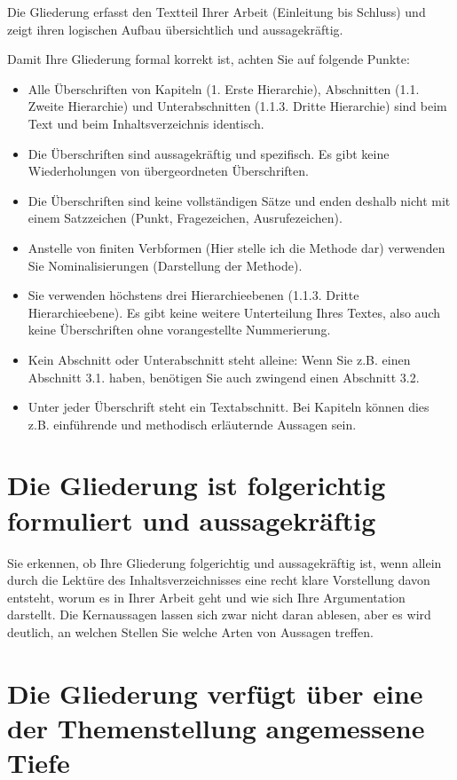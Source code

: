 Die Gliederung erfasst den Textteil Ihrer Arbeit (Einleitung bis Schluss) und zeigt ihren logischen Aufbau übersichtlich und aussagekräftig.

Damit Ihre Gliederung formal korrekt ist, achten Sie auf folgende Punkte:
\begin{itemize}[label={--}]
\item Alle Überschriften von Kapiteln (1. Erste Hierarchie), Abschnitten (1.1. Zweite Hierarchie) und Unterabschnitten (1.1.3. Dritte Hierarchie) sind beim Text und beim Inhaltsverzeichnis identisch.
\item Die Überschriften sind aussagekräftig und spezifisch. Es gibt keine Wiederholungen von übergeordneten Überschriften.
\item Die Überschriften sind keine vollständigen Sätze und enden deshalb nicht mit einem Satzzeichen (Punkt, Fragezeichen, Ausrufezeichen).
\item Anstelle von finiten Verbformen (\glqq Hier stelle ich die Methode dar\grqq{}) verwenden Sie Nominalisierungen (\glqq Darstellung der Methode\grqq{}).
\item Sie verwenden höchstens drei Hierarchieebenen (1.1.3. Dritte Hierarchieebene). Es gibt keine weitere Unterteilung Ihres Textes, also auch keine Überschriften ohne vorangestellte Nummerierung.
\item Kein Abschnitt oder Unterabschnitt steht alleine: Wenn Sie z.B. einen Abschnitt 3.1. haben, benötigen Sie auch zwingend einen Abschnitt 3.2.
\item Unter jeder Überschrift steht ein Textabschnitt. Bei Kapiteln können dies z.B. einführende und methodisch erläuternde Aussagen sein.
\end{itemize}

\section{Die Gliederung ist folgerichtig formuliert und aussagekräftig}
\label{sec:gliederung-folgerichtig}

Sie erkennen, ob Ihre Gliederung folgerichtig und aussagekräftig ist, wenn allein durch die Lektüre des Inhaltsverzeichnisses eine recht klare Vorstellung davon entsteht, worum es in Ihrer Arbeit geht und wie sich Ihre Argumentation darstellt. Die Kernaussagen lassen sich zwar nicht daran ablesen, aber es wird deutlich, an welchen Stellen Sie welche Arten von Aussagen treffen.

\section{Die Gliederung verfügt über eine der Themenstellung angemessene Tiefe}
\label{sec:gliederung-tiefe}

